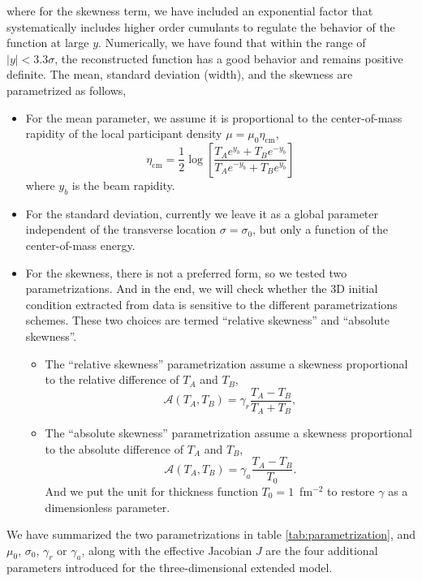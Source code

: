 where for the skewness term, we have included an exponential factor that systematically includes higher order cumulants to regulate the behavior of the function at large $y$.
Numerically, we have found that within the range of $|y| < 3.3\sigma$, the reconstructed function has a good behavior and remains positive definite.
The mean, standard deviation (width), and the skewness are parametrized as follows,
\begin{itemize}
\item For the mean parameter, we assume it is proportional to the center-of-mass rapidity of the local participant density $\mu = \mu_0\eta_\text{cm}$,
\begin{equation}
  \eta_\text{cm}=\frac{1}{2} \log \left[\frac{T_A e^{y_b}+T_Be^{-y_b}}{T_A e^{-y_b}+T_B e^{y_b}}\right]
\end{equation}
where $y_b$ is the beam rapidity.
\item For the standard deviation, currently we leave it as a global parameter independent of the transverse location $\sigma = \sigma_0$, but only a function of the center-of-mass energy.
\item For the skewness, there is not a preferred form, so we tested two parametrizations. 
And in the end, we will check whether the 3D initial condition extracted from data is sensitive to the different parametrizations schemes.
These two choices are termed ``relative skewness'' and ``absolute skewness''.
\begin{itemize}
\item The ``relative skewness'' parametrization assume a skewness proportional to the relative difference of $T_A$ and $T_B$,
\begin{equation}
  \mathcal{A}(T_A, T_B) = \gamma_r\frac{T_A - T_B}{T_A + T_B},
\end{equation}
\item The ``absolute skewness'' parametrization assume a skewness proportional to the absolute difference of $T_A$ and $T_B$,
\begin{equation}
  \mathcal{A}(T_A, T_B) = \gamma_a \frac{T_A - T_B}{T_0}.
\end{equation}
And we put the unit for thickness function $T_0=1$~fm$^{-2}$ to restore $\gamma$ as a dimensionless parameter.
\end{itemize}
\end{itemize}
We have summarized the two parametrizations in table \ref{tab:parametrization}, and $\mu_0$, $\sigma_0$, $\gamma_r$ or $\gamma_a$, along with the effective Jacobian $J$ are the four additional parameters introduced for the three-dimensional extended \trento model.
